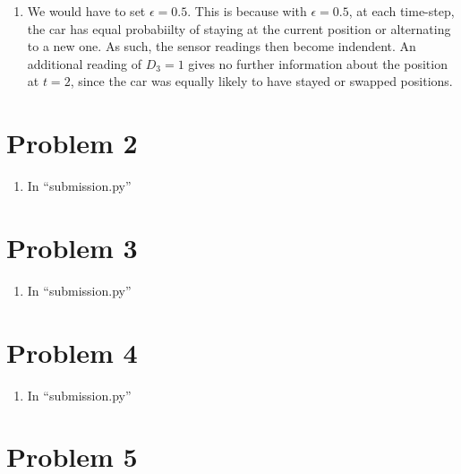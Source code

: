 \documentclass[12pt]{article}
\begin{document}
\begin{enumerate}[label=(\alph*)]
\begin{enumerate}[label=(\roman*)]
    \item We would have to set $\epsilon = 0.5$. This is because with $\epsilon = 0.5$, at each time-step, the car has equal probabiilty of staying at the current position or alternating to a new one. As such, the sensor readings then become indendent. An additional reading of $D_3 = 1$ gives no further information about the position at $t = 2$, since the car was equally likely to have stayed or swapped positions.
  \end{enumerate}
\end{enumerate}

\section*{Problem 2}

\begin{enumerate}[label=(\alph*)]
  \item In ``submission.py''
\end{enumerate}

\section*{Problem 3}

\begin{enumerate}[label=(\alph*)]
  \item In ``submission.py''
\end{enumerate}

\section*{Problem 4}

\begin{enumerate}[label=(\alph*)]
  \item In ``submission.py''
\end{enumerate}

\section*{Problem 5}
\end{document}
